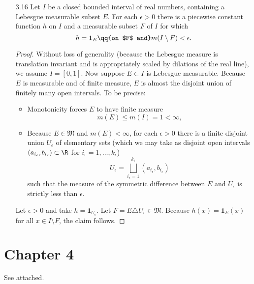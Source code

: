 \documentclass[onesided]{ccg-pset}
\renewcommand{\sM}{\mathfrak{M}}
\renewcommand{\id}[1]{\mathbf{1}_{ #1 }}
\begin{document}
\begin{enumerate}
\item[3.16] Let $I$ be a closed bounded interval of real numbers, containing a Lebesgue measurable subset $E$. For each $\epsilon > 0$ there is a piecewise constant function $h$ on $I$ and a measurable subset $F$ of $I$ for which
\begin{equation*}
    h = \id{E} \qq{on $F$ and} m(I\setminus F) < \epsilon.
\end{equation*}

\begin{proof}
Without loss of generality (because the Lebesgue measure is translation invariant and is appropriately scaled by dilations of the real line), we assume $I = [0,1]$. Now suppose $E \subset I$ is Lebesgue measurable. Because $E$ is measurable and of finite measure, $E$ is almost the disjoint union of finitely many open intervals. To be precise:

\begin{itemize}
    \item Monotonicity forces $E$ to have finite measure
          \begin{equation*}
              m(E) \le m(I) = 1 < \infty,
          \end{equation*}
    \item Because $E \in \sM$ and $m(E) < \infty$, for each $\epsilon > 0$ there is a finite disjoint union $U_\epsilon$ of elementary sets (which we may take as disjoint open intervals $(a_{i_\epsilon}, b_{i_\epsilon}) \subset \R$ for $i_\epsilon = 1, \ldots, k_\epsilon$)
          \[U_\epsilon = \bigsqcup_{i_\epsilon = 1}^{k_\epsilon} (a_{i_\epsilon}, b_{i_\epsilon})\]
          such that the measure of the symmetric difference between $E$ and $U_\epsilon$ is strictly less than $\epsilon$. 
\end{itemize}

Let $\epsilon > 0$ and take $h = \id{U_\epsilon}$. Let $F = E \triangle U_\epsilon \in \sM$. Because $h(x) = \id{E}(x)$ for all $x \in I \setminus F$, the claim follows.
\end{proof}
\end{enumerate}

\section*{Chapter 4}

See attached.



\end{document}
